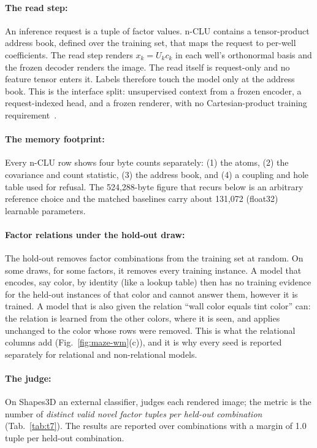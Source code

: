 \documentclass{article} %
\begin{document}
\paragraph{The read step:} An inference request is a tuple of factor values. n-CLU contains a tensor-product address book,
defined over the training set, that maps the request to per-well coefficients. The read step renders
$x_k=U_k c_k$ in each well's orthonormal basis and the frozen decoder renders the image. The
read itself is request-only and no feature tensor enters it.
Labels therefore touch the model only at the address book. This is the interface split:
unsupervised context from a frozen encoder, a request-indexed head, and a frozen renderer, with no Cartesian-product
training requirement~\citep{wiedemer_compositional_2023,lachapelle_additive_2023,montero_lost_2022}.

\paragraph{The memory footprint:} Every n-CLU row shows four byte counts separately: (1) the atoms, (2) the covariance and count statistic, (3) the address book, and
(4) a coupling and hole table used for refusal. The 524,288-byte figure that recurs below is an arbitrary reference choice and the matched baselines carry about 131,072 (float32) learnable parameters. 

\paragraph{Factor relations under the hold-out draw:} The hold-out removes factor combinations from the training set at random. On some draws, for some factors, it removes every training
instance. A model that encodes, say color, by identity (like a lookup table) then has no training evidence for the
held-out instances of that color and cannot answer them, however it is trained. A model that is
also given the relation ``wall color equals tint color'' can: the relation is learned from the
other colors, where it is seen, and applies unchanged to the color whose rows were removed. This is
what the relational columns add (Fig.~\ref{fig:maze-wm}(c)), and it is why every seed is reported
separately for relational and non-relational models.

\paragraph{The judge:} On Shapes3D an external classifier, judges each rendered image; the metric is the number of \emph{distinct valid novel
factor tuples per held-out combination} (Tab.~\ref{tab:t7}). The results are reported over combinations with a margin of 1.0 tuple per held-out combination.
\end{document}
